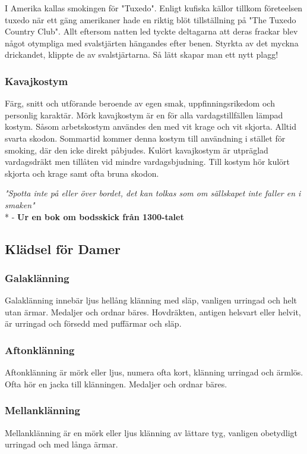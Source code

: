 I Amerika kallas smokingen för "Tuxedo". Enligt kufiska källor tillkom företeelsen tuxedo när ett gäng amerikaner hade en riktig blöt tillställning på "The Tuxedo Country Club". Allt eftersom natten led tyckte deltagarna att deras frackar blev något otympliga med svalstjärten hängandes efter benen. Styrkta av det myckna drickandet, klippte de av svalstjärtarna. Så lätt skapar man ett nytt plagg!

\subsubsection*{\textbf{Kavajkostym}}

Färg, snitt och utförande beroende av egen smak, uppfinningsrikedom och personlig karaktär. Mörk kavajkostym är en för alla vardagstillfällen lämpad kostym. Såsom arbetskostym användes den med vit krage och vit skjorta. Alltid svarta skodon. Sommartid kommer denna kostym till användning i stället för smoking, där den icke direkt påbjudes. Kulört kavajkostym är utpräglad vardagsdräkt men tillåten vid mindre vardagsbjudning. Till kostym hör kulört skjorta och krage samt ofta bruna skodon.

\textit{"Spotta inte på eller över bordet, det kan tolkas som om sällskapet inte faller en i smaken"}\\* - \textbf{Ur en bok om bodsskick från 1300-talet}

\subsection*{\textbf{Klädsel för Damer}}
\subsubsection*{\textbf{Galaklänning}}
Galaklänning innebär ljus hellång klänning med släp, vanligen urringad och helt utan ärmar. Medaljer och ordnar bäres. Hovdräkten, antigen helsvart eller helvit, är urringad och försedd med puffärmar och släp.

\subsubsection*{\textbf{Aftonklänning}}
Aftonklänning är mörk eller ljus, numera ofta kort, klänning urringad och ärmlös. Ofta hör en jacka till klänningen. Medaljer och ordnar bäres.

\subsubsection*{\textbf{Mellanklänning}}
Mellanklänning är en mörk eller ljus klänning av lättare tyg, vanligen obetydligt urringad och med långa ärmar.


